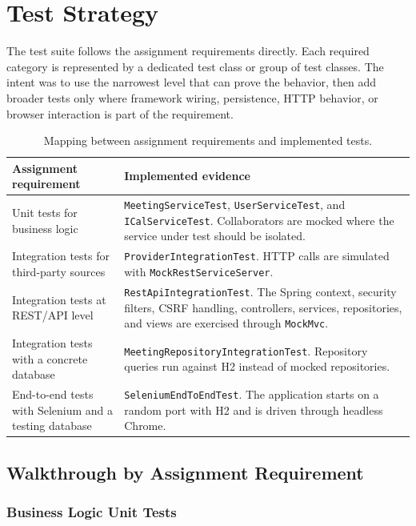 \chapter{Test Strategy} \label{cap:strategy}

The test suite follows the assignment requirements directly. Each required category is represented by a dedicated test class or group of test classes. The intent was to use the narrowest level that can prove the behavior, then add broader tests only where framework wiring, persistence, HTTP behavior, or browser interaction is part of the requirement.

\begin{table}[H]
\centering
\begin{tabular}{p{}p{}}
\toprule
\textbf{Assignment requirement} & \textbf{Implemented evidence} \\
\midrule
Unit tests for business logic & \texttt{MeetingServiceTest}, \texttt{UserServiceTest}, and \texttt{ICalServiceTest}. Collaborators are mocked where the service under test should be isolated. \\
Integration tests for third-party sources & \texttt{ProviderIntegrationTest}. HTTP calls are simulated with \texttt{MockRestServiceServer}. \\
Integration tests at REST/API level & \texttt{RestApiIntegrationTest}. The Spring context, security filters, CSRF handling, controllers, services, repositories, and views are exercised through \texttt{MockMvc}. \\
Integration tests with a concrete database & \texttt{MeetingRepositoryIntegrationTest}. Repository queries run against H2 instead of mocked repositories. \\
End-to-end tests with Selenium and a testing database & \texttt{SeleniumEndToEndTest}. The application starts on a random port with H2 and is driven through headless Chrome. \\
\bottomrule
\end{tabular}
\caption{Mapping between assignment requirements and implemented tests.}
\end{table}

\newpage 

\section{Walkthrough by Assignment Requirement}

\subsection{Business Logic Unit Tests}

